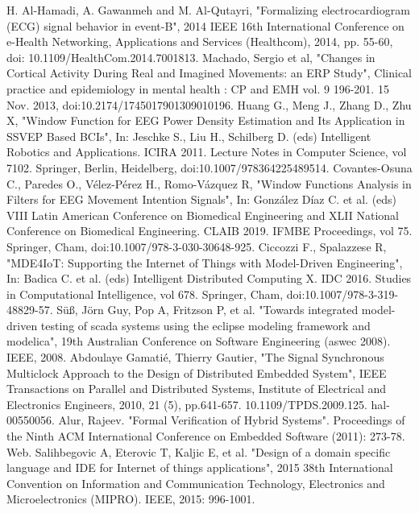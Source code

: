 \documentclass[11pt, oneside]{article}   	%
\begin{document}
\begin{thebibliography}{99}  
H. Al-Hamadi, A. Gawanmeh and M. Al-Qutayri, "Formalizing electrocardiogram (ECG) signal behavior in event-B", 2014 IEEE 16th International Conference on e-Health Networking, Applications and Services (Healthcom), 2014, pp. 55-60, doi: 10.1109/HealthCom.2014.7001813.  
Machado, Sergio et al, "Changes in Cortical Activity During Real and Imagined Movements: an ERP Study", Clinical practice and epidemiology in mental health : CP and EMH vol. 9 196-201. 15 Nov. 2013, doi:10.2174/1745017901309010196. 
Huang G., Meng J., Zhang D., Zhu X, "Window Function for EEG Power Density Estimation and Its Application in SSVEP Based BCIs", In: Jeschke S., Liu H., Schilberg D. (eds) Intelligent Robotics and Applications. ICIRA 2011. Lecture Notes in Computer Science, vol 7102. Springer, Berlin, Heidelberg, doi:10.1007/978364225489514. 
Covantes-Osuna C., Paredes O., Vélez-Pérez H., Romo-Vázquez R, "Window Functions Analysis in Filters for EEG Movement Intention Signals", In: González Díaz C. et al. (eds) VIII Latin American Conference on Biomedical Engineering and XLII National Conference on Biomedical Engineering. CLAIB 2019. IFMBE Proceedings, vol 75. Springer, Cham, doi:10.1007/978-3-030-30648-925.
Ciccozzi F., Spalazzese R, "MDE4IoT: Supporting the Internet of Things with Model-Driven Engineering", In: Badica C. et al. (eds) Intelligent Distributed Computing X. IDC 2016. Studies in Computational Intelligence, vol 678. Springer, Cham, doi:10.1007/978-3-319-48829-57.
Süß, Jörn Guy, Pop A, Fritzson P, et al. "Towards integrated model-driven testing of scada systems using the eclipse modeling framework and modelica", 19th Australian Conference on Software Engineering (aswec 2008). IEEE, 2008.
Abdoulaye Gamatié, Thierry Gautier, "The Signal Synchronous Multiclock Approach to the Design of Distributed Embedded System", IEEE Transactions on Parallel and Distributed Systems, Institute of Electrical and Electronics Engineers, 2010, 21 (5), pp.641-657. 10.1109/TPDS.2009.125. hal-00550056.
Alur, Rajeev. "Formal Verification of Hybrid Systems". Proceedings of the Ninth ACM International Conference on Embedded Software (2011): 273-78. Web.
Salihbegovic A, Eterovic T, Kaljic E, et al. "Design of a domain specific language and IDE for Internet of things applications", 2015 38th International Convention on Information and Communication Technology, Electronics and Microelectronics (MIPRO). IEEE, 2015: 996-1001.

\end{thebibliography}
\end{document}
